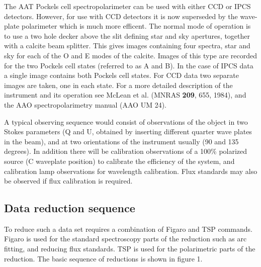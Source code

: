 \documentclass[11pt,twoside,nolof,noabs]{starlink}
\begin{document}
The AAT Pockels cell spectropolarimeter can be used with either CCD or IPCS
detectors. However, for use with CCD detectors it is now superseded by the
wave-plate polarimeter which is much more efficent.
The normal mode of operation is to use a two hole decker above
the slit defining star and sky apertures, together with a calcite beam
splitter. This gives images containing four spectra, star and sky for each
of the O and E modes of the calcite. Images of this type are recorded for
the two Pockels cell states (referred to as A and B). In the case of IPCS data
a single image contains both Pockels cell states. For CCD data two separate
images are taken, one in each state. For a more detailed description of
the instrument and its operation see McLean et al. (MNRAS \textbf{209}, 655,
1984), and the AAO spectropolarimetry manual (AAO UM 24).

A typical observing sequence would consist of observations of the
object in two Stokes parameters (Q and U, obtained by inserting different
quarter wave plates in the beam), and at two orientations of the instrument
usually (90 and 135 degrees). In addition there will be calibration
observations of a 100\% polarized source (C waveplate position) to calibrate
the efficiency of the system, and calibration lamp observations for wavelength
calibration. Flux standards may also be observed if flux calibration is
required.

\subsection{Data reduction sequence}

To reduce such a data set requires a combination of Figaro and TSP commands.
Figaro is used for the standard spectroscopy parts of the reduction such as
arc fitting, and reducing flux standards. TSP is used for the polarimetric
parts of the reduction. The basic sequence of reductions is shown in figure 1.
\end{document}
